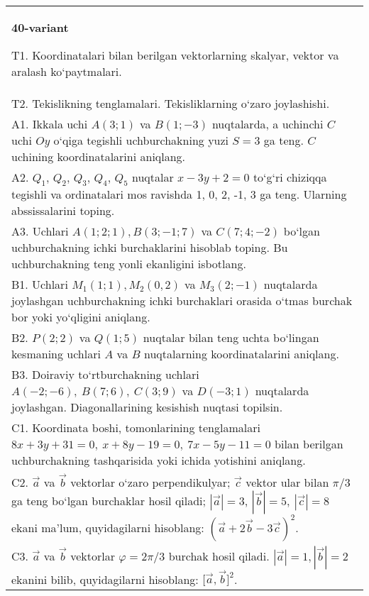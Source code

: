 \documentclass{article}
\begin{document}
\begin{tabular}{m{17cm}}
\textbf{40-variant}

T1. 
Koordinatalari bilan berilgan vektorlarning skalyar, vektor va aralash ko‘paytmalari.
 \\
T2. 
Tekislikning tenglamalari. Tekisliklarning o‘zaro joylashishi.
 \\
A1. 
Ikkala uchi $A (3;1) $ va $B (1;-3) $ nuqtalarda, a
uchinchi $C$ uchi $Oy$ o‘qiga tegishli uchburchakning
yuzi $S=3$ ga teng. $C$ uchining koordinatalarini aniqlang.
 \\
A2. 
$Q_1$, $Q_2$, $Q_3$, $Q_4$, $Q_5$ nuqtalar
$x-3y+2=0$ to‘g‘ri chiziqqa tegishli va ordinatalari mos ravishda
1, 0, 2, -1, 3 ga teng. Ularning abssissalarini toping.
 \\
A3. 
Uchlari $A (1;2;1), B (3;-1;7) $ va $C (7;4;-2) $ bo‘lgan uchburchakning
ichki burchaklarini hisoblab toping. Bu uchburchakning teng yonli ekanligini isbotlang.
 \\
B1. 
Uchlari \(M_{1} (1;1), M_{2} (0,2) \) va
\(M_{3} (2;-1) \) nuqtalarda joylashgan uchburchakning ichki 
burchaklari orasida o‘tmas burchak bor yoki yo‘qligini aniqlang.
 \\
B2. 
\(P (2;2) \) va \(Q (1;5) \) nuqtalar bilan teng uchta
bo‘lingan kesmaning uchlari $A$ va $B$ nuqtalarning
koordinatalarini aniqlang.
 \\
B3. 
Doiraviy to‘rtburchakning uchlari
\(A (-2;-6),\ B (7;6),\ C (3;9) \) va \(D (-3;1) \) nuqtalarda
joylashgan. Diagonallarining kesishish nuqtasi topilsin.
 \\
C1. 
Koordinata boshi, tomonlarining tenglamalari
\(8x+3y+31=0,\ x+8y-19=0,\ 7x-5y-11=0\) bilan
berilgan uchburchakning tashqarisida yoki ichida yotishini aniqlang.
 \\
C2. 
$\vec{a}$ va $\vec{b}$ vektorlar o‘zaro perpendikulyar; $\vec{c}$ vektor ular bilan $\pi/3$ ga teng bo‘lgan burchaklar hosil qiladi; $|\vec{a}| = 3$, $|\vec{b}| = 5,\ |\vec{c}| = 8$ ekani ma’lum, quyidagilarni hisoblang:
$ (\vec{a} + 2\vec{b} - 3\vec{c}) ^{2}$.
 \\
C3. 
$\vec{a}$ va $\vec{b}$ vektorlar $\varphi = 2\pi/3$ burchak hosil qiladi. $|\vec{a}| = 1,|\vec{b}| = 2$ ekanini bilib, quyidagilarni hisoblang:
$\lbrack\vec{a},\vec{b}\rbrack^{2}$.
 \\

\end{tabular}
\vspace{1cm}
\end{document}
